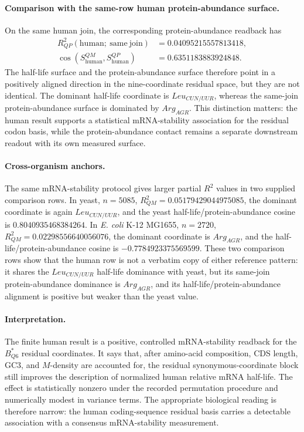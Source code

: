 \paragraph{Comparison with the same-row human protein-abundance surface.}
On the same human join, the corresponding protein-abundance readback has
$$
\begin{aligned}
R^2_{QP}(\mathrm{human};\ \mathrm{same\ join}) &= 0.04095215557813418,\\
\cos(S^{QM}_{\mathrm{human}},S^{QP}_{\mathrm{human}}) &= 0.6351183883924848.
\end{aligned}
$$
The half-life surface and the protein-abundance surface therefore point in a positively aligned direction in the nine-coordinate residual space, but they are not identical.  The dominant half-life coordinate is $Leu_{CUN/UUR}$, whereas the same-join protein-abundance surface is dominated by $Arg_{AGR}$.  This distinction matters: the human result supports a statistical mRNA-stability association for the residual codon basis, while the protein-abundance contact remains a separate downstream readout with its own measured surface.

\paragraph{Cross-organism anchors.}
The same mRNA-stability protocol gives larger partial $R^2$ values in two supplied comparison rows.  In yeast, $n=5085$, $R^2_{QM}=0.05179429044975085$, the dominant coordinate is again $Leu_{CUN/UUR}$, and the yeast half-life/protein-abundance cosine is $0.8040935468384264$.  In \emph{E. coli} K-12 MG1655, $n=2720$, $R^2_{QM}=0.02298556640056076$, the dominant coordinate is $Arg_{AGR}$, and the half-life/protein-abundance cosine is $-0.7784923375569599$.  These two comparison rows show that the human row is not a verbatim copy of either reference pattern: it shares the $Leu_{CUN/UUR}$ half-life dominance with yeast, but its same-join protein-abundance dominance is $Arg_{AGR}$, and its half-life/protein-abundance alignment is positive but weaker than the yeast value.

\paragraph{Interpretation.}
The finite human result is a positive, controlled mRNA-stability readback for the $B^{\ast}_{Q6}$ residual coordinates.  It says that, after amino-acid composition, CDS length, GC3, and $M$-density are accounted for, the residual synonymous-coordinate block still improves the description of normalized human relative mRNA half-life.  The effect is statistically nonzero under the recorded permutation procedure and numerically modest in variance terms.  The appropriate biological reading is therefore narrow: the human coding-sequence residual basis carries a detectable association with a consensus mRNA-stability measurement.

